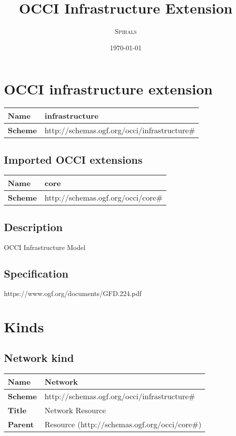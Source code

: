\documentclass{article}
\title{OCCI Infrastructure Extension} %
\author{\textsc{Spirals}} %
\date{\today} %
\begin{document}
 

\maketitle %
\newpage
\section{OCCI infrastructure extension}
\begin{center}
\begin{tabular}{|l|l|}
  \hline
  \textbf{Name} & infrastructure \\
  \hline  
  \textbf{Scheme} & http://schemas.ogf.org/occi/infrastructure\# \\
  \hline
\end{tabular}
\end{center}
\subsection{Imported OCCI extensions}

\begin{center} 
\begin{tabular}{|l|l|}
  \hline
  \textbf{Name} & core \\
  \hline  
  \textbf{Scheme} & http://schemas.ogf.org/occi/core\# \\
  \hline
\end{tabular}
\end{center}

\subsection{Description}
OCCI Infrastructure Model
\subsection{Specification}
https://www.ogf.org/documents/GFD.224.pdf
\section{Kinds}
\subsection{Network kind}
\begin{center}
\begin{tabular}{|l|l|}
  \hline
  \textbf{Name} & Network \\
  \hline  
  \textbf{Scheme} & http://schemas.ogf.org/occi/infrastructure\# \\
  \hline
  \textbf{Title} & Network Resource \\
  \hline
  \textbf{Parent} & Resource (http://schemas.ogf.org/occi/core\#) \\
  \hline
\end{tabular}
\end{center}
\end{document}
